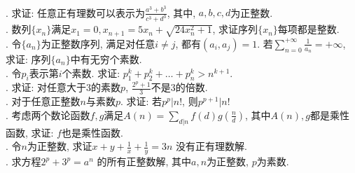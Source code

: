 \documentclass[10pt,column,letterpaper]{article}
\title{}
\author{}
\theoremstyle{mythmstyle}
\begin{document}
\large
{}\\

. 求证: 任意正有理数可以表示为$\frac{a^3 + b^3}{c^3 + d^3}$, 其中, $a,b,c,d$为正整数.\\

. 数列$\{x_n\}$满足$x_1 = 0, x_{n+1} = 5x_n + \sqrt{24x_{n}^{2}+1}$, 求证序列$\{x_n\}$每项都是整数.\\

. 令$\{a_n\}$为正整数序列, 满足对任意$i \not= j$, 都有$(a_i, a_j) = 1$. 若$\sum\limits_{n=0}^{+\infty}\frac{1}{a_n} = +\infty$, 求证: 序列$\{a_n\}$中有无穷个素数.\\

. 令$p_i$表示第$i$个素数. 求证: $p_1^{k} + p_2^{k} + \dots + p_n^{k} > n^{k+1}$.\\

. 求证: 对任意大于3的素数$p$, $\frac{2^p+1}{3}$不是3的倍数.\\

. 对于任意正整数$n$与素数$p$. 求证: 若$p^p|n!$, 则$p^{p+1}|n!$\\

. 考虑两个数论函数$f,g$满足$A(n) = \sum\limits_{d|n}f(d)g(\frac{n}{d})$, 其中$A(n),g$都是乘性函数, 求证: $f$也是乘性函数.\\

. 令$n$为正整数, 求证$x+y+\frac{1}{x}+\frac{1}{y} = 3n$ 没有正有理数解. \\

. 求方程$2^p + 3^p = a^n$ 的所有正整数解, 其中$a,n$为正整数, $p$为素数.\\
\end{document}
